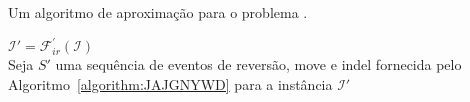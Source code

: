 \begin{algorithm}[!tbh]
  \caption{Um algoritmo de aproximação para o problema \SbFIRI{}.\label{algorithm:MODRXVSQ}}
  $\mathcal{I}' = \mathcal{F}_{ir}^{'}(\mathcal{I})$ \\
  Seja $S'$ uma sequência de eventos de reversão, move e indel fornecida pelo Algoritmo~\ref{algorithm:JAJGNYWD} para a instância $\mathcal{I}'$ \\
\end{algorithm}